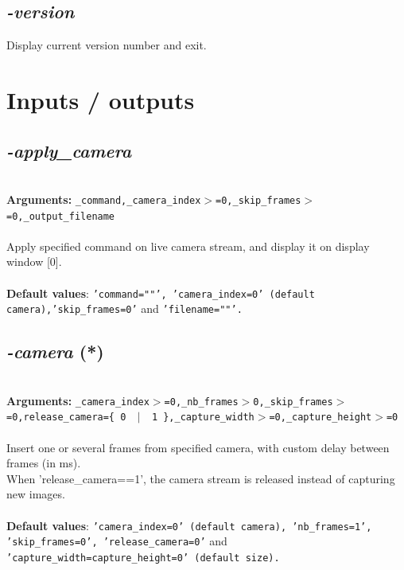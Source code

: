 \documentclass[a4paper,11pt,twoside]{book}
\begin{document}
\subsection{\emph{-version} }\vspace*{-0.5em}
Display current version number and exit.

\section{Inputs / outputs}


\subsection{\emph{-apply\_camera} }\vspace*{-0.5em}
~\\\textbf{Arguments: } 
{\small \texttt{\_command,\_camera\_index$>$=0,\_skip\_frames$>$=0,\_output\_filename}}\\~\\
Apply specified command on live camera stream, and display it on display window [0].
~\\~\\\textbf{Default values}: {\small \texttt{'command=""', 'camera\_index=0' (default camera),'skip\_frames=0'} and \texttt{'filename=""'.}}


\subsection{\emph{-camera} (*)}\vspace*{-0.5em}
~\\\textbf{Arguments: } 
{\small \texttt{\_camera\_index$>$=0,\_nb\_frames$>$0,\_skip\_frames$>$=0,release\_camera=\{ 0 ~$|$~ 1 \},\_capture\_width$>$=0,\_capture\_height$>$=0}}\\~\\
Insert one or several frames from specified camera, with custom delay between frames (in ms).
~\\When 'release\_camera==1', the camera stream is released instead of capturing new images.
~\\~\\\textbf{Default values}: {\small \texttt{'camera\_index=0' (default camera), 'nb\_frames=1', 'skip\_frames=0', 'release\_camera=0'} and \texttt{'capture\_width=capture\_height=0' (default size).}}
\end{document}
